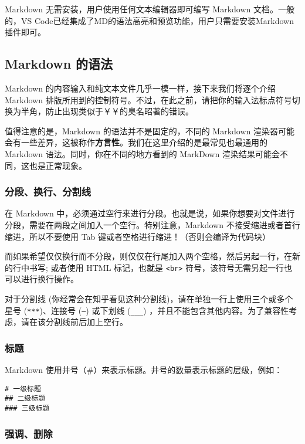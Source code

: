 \documentclass[../main.tex]{subfiles}
\begin{document}
Markdown 无需安装，用户使用任何文本编辑器即可编写 Markdown 文档。一般的，VS Code已经集成了MD的语法高亮和预览功能，用户只需要安装Markdown插件即可。

\subsection{Markdown 的语法}

Markdown 的内容输入和纯文本文件几乎一模一样，接下来我们将逐个介绍 Markdown 排版所用到的控制符号。不过，在此之前，请把你的输入法标点符号切换为半角，防止出现类似于￥￥的臭名昭著的错误。

值得注意的是，Markdown 的语法并不是固定的，不同的 Markdown 渲染器可能会有一些差异，这被称作\textbf{方言性}。我们在这里介绍的是最常见也最通用的 Markdown 语法。同时，你在不同的地方看到的 MarkDown 渲染结果可能会不同，这也是正常现象。

\subsubsection{分段、换行、分割线}

在 Markdown 中，必须通过空行来进行分段。也就是说，如果你想要对文件进行分段，需要在两段之间加入一个空行。特别注意，Markdown 不接受缩进或者首行缩进，所以不要使用 Tab 键或者空格进行缩进！（否则会编译为代码块）

而如果希望仅仅换行而不分段，则仅仅在行尾加入两个空格，然后另起一行，在新的行中书写; 或者使用 HTML 标记，也就是 \texttt{<br>} 符号，该符号无需另起一行也可以进行换行操作。

对于分割线 (你经常会在知乎看见这种分割线)，请在单独一行上使用三个或多个星号 (\texttt{***})、连接号 (\texttt{---}) 或下划线 (\texttt{\_\_\_}) ，并且不能包含其他内容。为了兼容性考虑，请在该分割线前后加上空行。

\subsubsection{标题}

Markdown 使用井号（\#）来表示标题。井号的数量表示标题的层级，例如：

\begin{lstlisting}
# 一级标题
## 二级标题
### 三级标题
\end{lstlisting}

\subsubsection{强调、删除}
\end{document}
